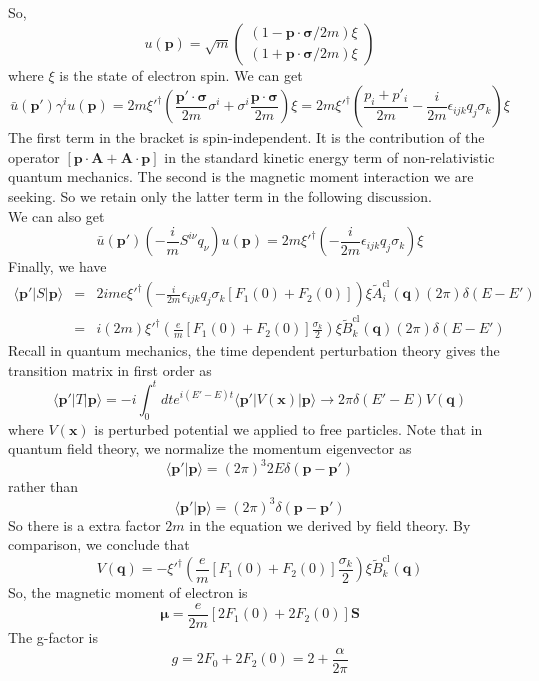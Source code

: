 So, 
\[u(\bm{p}) = \sqrt{m}  \begin{pmatrix}(1 - \bm{p}\cdot\bm{\sigma}/2m)\xi\\(1 + \bm{p}\cdot\bm{\sigma}/2m)\xi\end{pmatrix} \]
where $\xi$ is the state of electron spin. We can get
\[\bar{u}(\bm{p}') \gamma^i u(\bm{p}) = 2m \xi'^{\dagger} \left( \frac{\bm{p}'\cdot\bm{\sigma}}{2m}\sigma^i + \sigma^i\frac{\bm{p}\cdot\bm{\sigma}}{2m} \right) \xi = 2m \xi'^{\dagger} \left( \frac{p_i + p'_i}{2m} -\frac{i}{2m}\epsilon_{ijk}q_j\sigma_k \right) \xi\]
The first term in the bracket is spin-independent. It is the contribution of the operator $[\bm{p}\cdot\bm{A} + \bm{A}\cdot\bm{p}]$ in the standard kinetic energy term of non-relativistic quantum mechanics. 
The second is the magnetic moment interaction we are seeking. So we retain only the latter term in the following discussion. \\
We can also get
\[\bar{u}(\bm{p}') \left( - \frac{i}{m}S^{i\nu}q_{\nu} \right) u(\bm{p}) = 2m \xi'^{\dagger} \left( -\frac{i}{2m}\epsilon_{ijk}q_j\sigma_k \right) \xi\]
Finally, we have
\begin{eqnarray}
\langle \bm{p}' | S | \bm{p} \rangle &=& 2ime \xi'^{\dagger} \left( -\frac{i}{2m}\epsilon_{ijk}q_j\sigma_k[F_1(0) + F_2(0)] \right) \xi \tilde{A}_{i}^{\mathrm{cl}}(\bm{q})(2\pi)\delta(E-E') \nonumber \\
&=& i(2m)\xi'^{\dagger} \left( \frac{e}{m}[F_1(0) + F_2(0)] \frac{\sigma_k}{2}\right) \xi \tilde{B}_{k}^{\mathrm{cl}}(\bm{q})(2\pi)\delta(E-E') \nonumber
\end{eqnarray}
Recall in quantum mechanics, the time dependent perturbation theory gives the transition matrix in first order as
\[\langle \bm{p}' | T | \bm{p} \rangle = -i\int_0^t dt e^{i(E'-E)t} \langle \bm{p}' | V(\bm{x}) | \bm{p} \rangle \to 2\pi\delta(E'-E)V(\bm{q})\]
where $V(\bm{x})$ is perturbed potential we applied to free particles. Note that in quantum field theory, we normalize the momentum eigenvector as
\[\langle \bm{p}' | \bm{p} \rangle = (2\pi)^3 2E \delta(\bm{p}-\bm{p}')  \]
rather than
\[\langle \bm{p}' | \bm{p} \rangle = (2\pi)^3 \delta(\bm{p}-\bm{p}')  \]
So there is a extra factor $2m$ in the equation we derived by field theory. By comparison, we conclude that
\[V(\bm{q}) = -\xi'^{\dagger} \left( \frac{e}{m}[F_1(0) + F_2(0)] \frac{\sigma_k}{2}\right) \xi \tilde{B}_{k}^{\mathrm{cl}}(\bm{q})\]
So, the magnetic moment of electron is
\[\bm{\mu} = \frac{e}{2m}[2F_1(0) + 2F_2(0)]\bm{S}\]
The g-factor is
\[g = 2F_0 + 2F_2(0) = 2 + \frac{\alpha}{2\pi}\]

